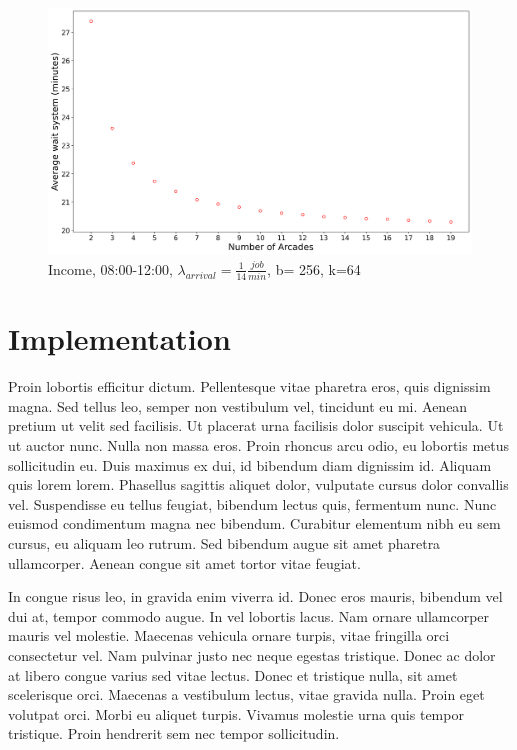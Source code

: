 \documentclass{article}
\begin{document}
\begin{figure}[H]
	\centering
	\captionsetup{justification=centering,margin=2cm}
	\includegraphics[scale=0.48]{images/avg_wait_sys_mor.png}
	\caption{Income, 08:00-12:00, $\lambda_{arrival}=\frac{1}{14} \frac{job}{min}$, b= 256, k=64}\label{figura:avg_wait_sys_mor}
\end{figure}

\section{Implementation}

Proin lobortis efficitur dictum. Pellentesque vitae pharetra eros, quis dignissim magna. Sed tellus leo, semper non vestibulum vel, tincidunt eu mi. Aenean pretium ut velit sed facilisis. Ut placerat urna facilisis dolor suscipit vehicula. Ut ut auctor nunc. Nulla non massa eros. Proin rhoncus arcu odio, eu lobortis metus sollicitudin eu. Duis maximus ex dui, id bibendum diam dignissim id. Aliquam quis lorem lorem. Phasellus sagittis aliquet dolor, vulputate cursus dolor convallis vel. Suspendisse eu tellus feugiat, bibendum lectus quis, fermentum nunc. Nunc euismod condimentum magna nec bibendum. Curabitur elementum nibh eu sem cursus, eu aliquam leo rutrum. Sed bibendum augue sit amet pharetra ullamcorper. Aenean congue sit amet tortor vitae feugiat.

In congue risus leo, in gravida enim viverra id. Donec eros mauris, bibendum vel dui at, tempor commodo augue. In vel lobortis lacus. Nam ornare ullamcorper mauris vel molestie. Maecenas vehicula ornare turpis, vitae fringilla orci consectetur vel. Nam pulvinar justo nec neque egestas tristique. Donec ac dolor at libero congue varius sed vitae lectus. Donec et tristique nulla, sit amet scelerisque orci. Maecenas a vestibulum lectus, vitae gravida nulla. Proin eget volutpat orci. Morbi eu aliquet turpis. Vivamus molestie urna quis tempor tristique. Proin hendrerit sem nec tempor sollicitudin.
\end{document}
